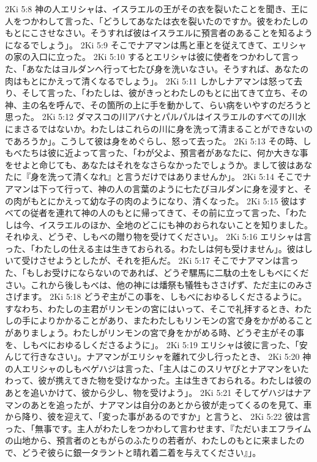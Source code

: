 2Ki 5:8  神の人エリシャは、イスラエルの王がその衣を裂いたことを聞き、王に人をつかわして言った、「どうしてあなたは衣を裂いたのですか。彼をわたしのもとにこさせなさい。そうすれば彼はイスラエルに預言者のあることを知るようになるでしょう」。
2Ki 5:9  そこでナアマンは馬と車とを従えてきて、エリシャの家の入口に立った。
2Ki 5:10  するとエリシャは彼に使者をつかわして言った、「あなたはヨルダンへ行って七たび身を洗いなさい。そうすれば、あなたの肉はもとにかえって清くなるでしょう」。
2Ki 5:11  しかしナアマンは怒って去り、そして言った、「わたしは、彼がきっとわたしのもとに出てきて立ち、その神、主の名を呼んで、その箇所の上に手を動かして、らい病をいやすのだろうと思った。
2Ki 5:12  ダマスコの川アバナとパルパルはイスラエルのすべての川水にまさるではないか。わたしはこれらの川に身を洗って清まることができないのであろうか」。こうして彼は身をめぐらし、怒って去った。
2Ki 5:13  その時、しもべたちは彼に近よって言った、「わが父よ、預言者があなたに、何か大きな事をせよと命じても、あなたはそれをなさらなかったでしょうか。まして彼はあなたに『身を洗って清くなれ』と言うだけではありませんか」。
2Ki 5:14  そこでナアマンは下って行って、神の人の言葉のように七たびヨルダンに身を浸すと、その肉がもとにかえって幼な子の肉のようになり、清くなった。
2Ki 5:15  彼はすべての従者を連れて神の人のもとに帰ってきて、その前に立って言った、「わたしは今、イスラエルのほか、全地のどこにも神のおられないことを知りました。それゆえ、どうぞ、しもべの贈り物を受けてください」。
2Ki 5:16  エリシャは言った、「わたしの仕える主は生きておられる。わたしは何も受けません」。彼はしいて受けさせようとしたが、それを拒んだ。
2Ki 5:17  そこでナアマンは言った、「もしお受けにならないのであれば、どうぞ騾馬に二駄の土をしもべにください。これから後しもべは、他の神には燔祭も犠牲もささげず、ただ主にのみささげます。
2Ki 5:18  どうぞ主がこの事を、しもべにおゆるしくださるように。すなわち、わたしの主君がリンモンの宮にはいって、そこで礼拝するとき、わたしの手によりかかることがあり、またわたしもリンモンの宮で身をかがめることがありましょう。わたしがリンモンの宮で身をかがめる時、どうぞ主がその事を、しもべにおゆるしくださるように」。
2Ki 5:19  エリシャは彼に言った、「安んじて行きなさい」。ナアマンがエリシャを離れて少し行ったとき、
2Ki 5:20  神の人エリシャのしもべゲハジは言った、「主人はこのスリヤびとナアマンをいたわって、彼が携えてきた物を受けなかった。主は生きておられる。わたしは彼のあとを追いかけて、彼から少し、物を受けよう」。
2Ki 5:21  そしてゲハジはナアマンのあとを追ったが、ナアマンは自分のあとから彼が走ってくるのを見て、車から降り、彼を迎えて、「変った事があるのですか」と言うと、
2Ki 5:22  彼は言った、「無事です。主人がわたしをつかわして言わせます、『ただいまエフライムの山地から、預言者のともがらのふたりの若者が、わたしのもとに来ましたので、どうぞ彼らに銀一タラントと晴れ着二着を与えてください』」。
